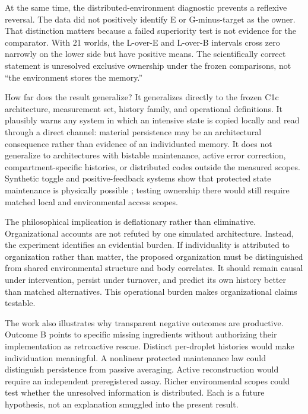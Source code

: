 \documentclass[11pt]{article}
\begin{document}
At the same time, the distributed-environment diagnostic prevents a reflexive reversal. The data did not positively identify E or G-minus-target as the owner. That distinction matters because a failed superiority test is not evidence for the comparator. With 21 worlds, the L-over-E and L-over-B intervals cross zero narrowly on the lower side but have positive means. The scientifically correct statement is unresolved exclusive ownership under the frozen comparisons, not ``the environment stores the memory.''

How far does the result generalize? It generalizes directly to the frozen C1c architecture, measurement set, history family, and operational definitions. It plausibly warns any system in which an intensive state is copied locally and read through a direct channel: material persistence may be an architectural consequence rather than evidence of an individuated memory. It does not generalize to architectures with bistable maintenance, active error correction, compartment-specific histories, or distributed codes outside the measured scopes. Synthetic toggle and positive-feedback systems show that protected state maintenance is physically possible \citep{gardner2000,xiong2003}; testing ownership there would still require matched local and environmental access scopes.

The philosophical implication is deflationary rather than eliminative. Organizational accounts are not refuted by one simulated architecture. Instead, the experiment identifies an evidential burden. If individuality is attributed to organization rather than matter, the proposed organization must be distinguished from shared environmental structure and body correlates. It should remain causal under intervention, persist under turnover, and predict its own history better than matched alternatives. This operational burden makes organizational claims testable.

The work also illustrates why transparent negative outcomes are productive. Outcome B points to specific missing ingredients without authorizing their implementation as retroactive rescue. Distinct per-droplet histories would make individuation meaningful. A nonlinear protected maintenance law could distinguish persistence from passive averaging. Active reconstruction would require an independent preregistered assay. Richer environmental scopes could test whether the unresolved information is distributed. Each is a future hypothesis, not an explanation smuggled into the present result.
\end{document}
